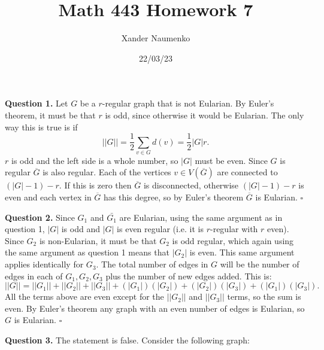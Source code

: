 \documentclass[letterpaper, reqno,11pt]{article}
\begin{document}
\title{Math 443 Homework 7}
\date{22/03/23}
\author{Xander Naumenko}
\maketitle

{\medskip\noindent\bf Question 1.} Let $G$ be a $r$-regular graph that is not Eularian. By Euler's theorem, it must be that $r$ is odd, since otherwise it would be Eularian. The only way this is true is if
\[
||G| |=\frac{1}{2}\sum_{v\in G}d(v)=\frac{1}{2}|G| r
.\]
$r$ is odd and the left side is a whole number, so $|G|$ must be even. Since $G$ is regular $\overline{G}$ is also regular. Each of the vertices $v\in V(\overline{G})$ are connected to $\left(|G|-1\right)-r$. If this is zero then $\overline{G}$ is disconnected, otherwise $\left( |G|-1 \right) -r$ is even and each vertex in $\overline{G}$ has this degree, so by Euler's theorem $\overline{G}$ is Eularian. $\square$

{\medskip\noindent\bf Question 2.} Since $G_1$ and $\bar{G_1}$ are Eularian, using the same argument as in question 1, $|G|$ is odd and $|G|$ is even regular (i.e. it is $r$-regular with $r$ even). Since $G_2$ is non-Eularian, it must be that $G_2$ is odd regular, which again using the same argument as question 1 means that $|G_2|$ is even. This same argument applies identically for $G_3$. The total number of edges in $G$ will be the number of edges in each of $G_1,G_2,G_3$ plus the number of new edges added. This is:
\[
| |G| |=| |G_1| |+| |G_2| |+| |G_3| |+\left( |G_1| \right) \left( |G_2| \right) +\left( |G_2| \right) \left( |G_3| \right)+\left( |G_1| \right) \left( |G_3| \right)
.\]
All the terms above are even except for the $| |G_2| |$ and $| |G_3| |$ terms, so the sum is even. By Euler's theorem any graph with an even number of edges is Eularian, so $G$ is Eularian. $\square$


{\medskip\noindent\bf Question 3.} The statement is false. Consider the following graph: 

\begin{center}
\end{center}
\end{document}
